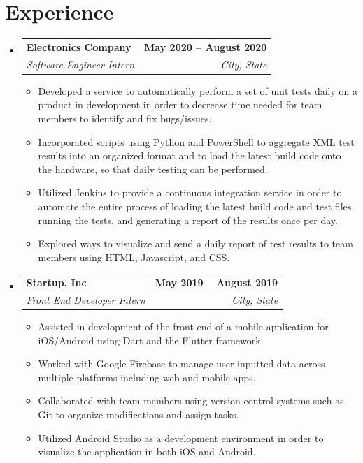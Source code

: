 \documentclass[letterpaper,11pt]{article}
\makeatletter
\newcommand{\resumeItem}[1]{
  \item\small{
    {#1 \vspace{-2pt}}
  }
}
\newcommand{\resumeSubheading}[4]{
  \vspace{-2pt}\item
    \begin{tabular*}{1.0\textwidth}[t]{l@{\extracolsep{\fill}}r}
      \textbf{#1} & \textbf{\small #2} \\
      \textit{\small#3} & \textit{\small #4} \\
    \end{tabular*}\vspace{-7pt}
}
\newcommand{\resumeSubHeadingListStart}{\begin{itemize}[leftmargin=0.0in, label={}]}
\newcommand{\resumeSubHeadingListEnd}{\end{itemize}}
\newcommand{\resumeItemListStart}{\begin{itemize}}
\newcommand{\resumeItemListEnd}{\end{itemize}\vspace{-5pt}}
\makeatother
\begin{document}
\section{Experience}
  \resumeSubHeadingListStart

    \resumeSubheading
      {Electronics Company}{May 2020 -- August 2020}
      {Software Engineer Intern}{City, State}
      \resumeItemListStart
        \resumeItem{Developed a service to automatically perform a set of unit tests daily on a product in development in order to decrease time needed for team members to identify and fix bugs/issues.}
        \resumeItem{Incorporated scripts using Python and PowerShell to aggregate XML test results into an organized format and to load the latest build code onto the hardware, so that daily testing can be performed.}
        \resumeItem{Utilized Jenkins to provide a continuous integration service in order to automate the entire process of loading the latest build code and test files, running the tests, and generating a report of the results once per day.}
        \resumeItem{Explored ways to visualize and send a daily report of test results to team members  using HTML, Javascript, and CSS.}
      \resumeItemListEnd

    \resumeSubheading
      {Startup, Inc}{May 2019 -- August 2019}
      {Front End Developer Intern}{City, State}
      \resumeItemListStart
        \resumeItem{Assisted in development of the front end of a mobile application for iOS/Android using Dart and the Flutter framework.}
        \resumeItem{Worked with Google Firebase to manage user inputted data across multiple platforms including web and mobile apps.}
        \resumeItem{Collaborated with team members using version control systems such as Git to organize modifications and assign tasks.}
        \resumeItem{Utilized Android Studio as a development environment in order to visualize the application in both iOS and Android.}
    \resumeItemListEnd
    
  \resumeSubHeadingListEnd
\vspace{-6pt}

\end{document}
